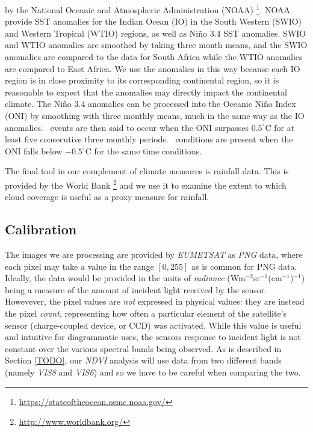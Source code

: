 by the National Oceanic and Atmospheric Administration
(NOAA) \footnote{\url{https://stateoftheocean.osmc.noaa.gov/}}. NOAA
provide SST anomalies for the Indian Ocean (IO) in the South Western
(SWIO) and Western Tropical (WTIO) regions, as well as Ni{\~n}o 3.4
SST anomalies. SWIO and WTIO anomalies are smoothed by taking three
month means, and the SWIO anomalies are compared to the data for South
Africa while the WTIO anomalies are compared to East Africa. We use
the anomalies in this way because each IO region is in close proximity
to its corresponding continental region, so it is reasonable to expect
that the anomalies may directly impact the continental climate. The
Ni{\~n}o 3.4 anomalies can be processed into the Oceanic Ni{\~n}o
Index (ONI) by smoothing with three monthly means, much in the same
way as the IO anomalies. \elnino\ events are then said to occur when
the ONI surpasses $0.5^{\circ}$C for at least five consecutive three
monthly periods. \nina\
conditions are present when the ONI falls
below $-0.5^{\circ}$C for the same time conditions.

The final tool in our complement of climate measures is rainfall
data. This is provided by the World
Bank \footnote{\url{http://www.worldbank.org/}} and we use it to
examine the extent to which cloud coverage is useful as a proxy
measure for rainfall.

\subsection{Calibration}

The images we are processing are provided by \emph{EUMETSAT} as
\emph{PNG} data, where each pixel may take a value in the range
$\left[0, 255\right]$ as is common for PNG data. Ideally, the data
would be provided in the units of \emph{radiance}
(Wm$^{-2}$sr$^{-1}$(cm$^{-1}$)$^{-1}$) being a measure of the amount
of incident light received by the sensor. Howevever, the pixel values
are \emph{not} expressed in physical values: they are instead the
pixel \emph{count}, representing how often a particular element of the
satellite's sensor (charge-coupled device, or CCD) was
activated. While this value is useful and intuitive for diagrammatic
uses, the sensors response to incident light is not constant over the
various spectral bands being observed. As is described in Section
\ref{TODO}, our \emph{NDVI} analysis will use data from two different
bands (namely \emph{VIS8} and \emph{VIS6}) and so we have to be
careful when comparing the two.

